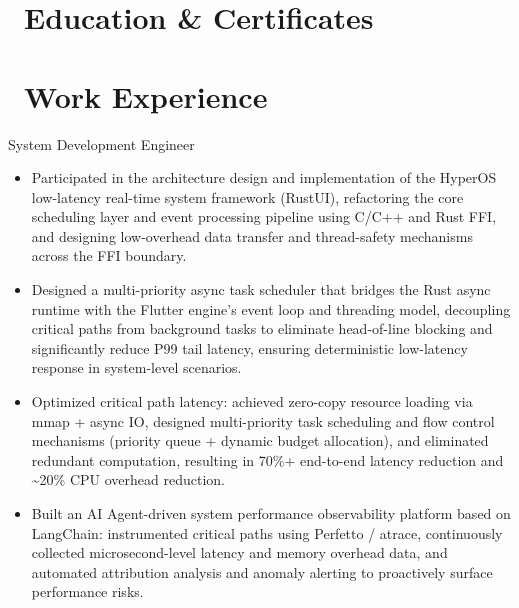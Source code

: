 \documentclass{resume}
\begin{document}



\section{\faGraduationCap\  Education \& Certificates}


\section{\faUsers\  Work Experience}
\begin{onehalfspacing}
System Development Engineer
\begin{itemize}
  \item Participated in the architecture design and implementation of the HyperOS low-latency real-time system framework (RustUI), refactoring the core scheduling layer and event processing pipeline using C/C++ and Rust FFI, and designing low-overhead data transfer and thread-safety mechanisms across the FFI boundary.
  \item Designed a multi-priority async task scheduler that bridges the Rust async runtime with the Flutter engine's event loop and threading model, decoupling critical paths from background tasks to eliminate head-of-line blocking and significantly reduce P99 tail latency, ensuring deterministic low-latency response in system-level scenarios.
  \item Optimized critical path latency: achieved zero-copy resource loading via mmap + async IO, designed multi-priority task scheduling and flow control mechanisms (priority queue + dynamic budget allocation), and eliminated redundant computation, resulting in 70\%+ end-to-end latency reduction and \textasciitilde20\% CPU overhead reduction.
  \item Built an AI Agent-driven system performance observability platform based on LangChain: instrumented critical paths using Perfetto / atrace, continuously collected microsecond-level latency and memory overhead data, and automated attribution analysis and anomaly alerting to proactively surface performance risks.
\end{itemize}
\end{onehalfspacing}
\end{document}

